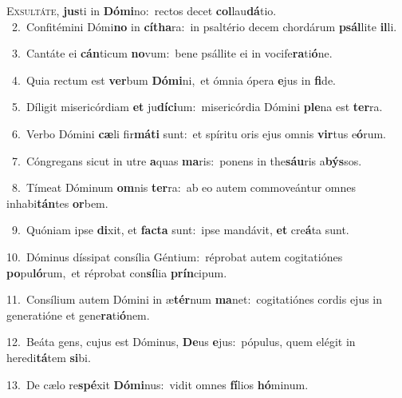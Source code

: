 \lettrine{\initial\textcolor{\initialcolor}{E}}{xsultáte,} \textbf{jus}\-ti in \textbf{Dó}\-\textbf{mi}no:~\star rectos decet \textbf{col}\-lau\-\textbf{dá}\-tio.\\
{\numbfont\textcolor{\numbcolor}{~2.}}~Confitémini Dómi\textbf{no} in \textbf{cí}\-\textbf{tha}ra:~\star in psaltério decem chordárum \textbf{psál}\-lite \textbf{il}\-li.\par
{\numbfont\textcolor{\numbcolor}{~3.}}~Cantáte ei \textbf{cán}\-ticum \textbf{no}\-vum:~\star bene psállite ei in vocife\-\textbf{ra}\-ti\-\textbf{ó}\-ne.\par
{\numbfont\textcolor{\numbcolor}{~4.}}~Quia rectum est \textbf{ver}\-bum \textbf{Dó}\-\textbf{mi}ni,~\star et ómnia ópera \textbf{e}\-jus in \textbf{fi}\-de.\par
{\numbfont\textcolor{\numbcolor}{~5.}}~Díligit misericórdiam \textbf{et} ju\-\textbf{dí}\-\textbf{ci}um:~\star misericórdia Dómini \textbf{ple}\-na est \textbf{ter}\-ra.\par
{\numbfont\textcolor{\numbcolor}{~6.}}~Verbo Dómini \textbf{cæ}\-li fir\-\textbf{má}\-\textbf{ti} sunt:~\star et spíritu oris ejus omnis \textbf{vir}\-tus e\-\textbf{ó}\-rum.\par
{\numbfont\textcolor{\numbcolor}{~7.}}~Cóngregans sicut in utre \textbf{a}\-quas \textbf{ma}\-ris:~\star ponens in the\-\textbf{sáu}\-ris a\-\textbf{býs}\-sos.\par
{\numbfont\textcolor{\numbcolor}{~8.}}~Tímeat Dóminum \textbf{om}\-nis \textbf{ter}\-ra:~\star ab eo autem commoveántur omnes inhabi\-\textbf{tán}\-tes \textbf{or}\-bem.\par
{\numbfont\textcolor{\numbcolor}{~9.}}~Quóniam ipse \textbf{di}\-xit, et \textbf{fac}\-\textbf{ta} sunt:~\star ipse mandávit, \textbf{et} cre\-\textbf{á}\-ta sunt.\par
{\numbfont\textcolor{\numbcolor}{10.}}~Dóminus díssipat consília Géntium:~\dagger réprobat autem cogitatiónes \textbf{po}\-pu\-\textbf{ló}\-rum,~\star et réprobat con\-\textbf{sí}\-lia \textbf{prín}\-cipum.\par
{\numbfont\textcolor{\numbcolor}{11.}}~Consílium autem Dómini in æ\-\textbf{tér}\-num \textbf{ma}\-net:~\star cogitatiónes cordis ejus in generatióne et gene\-\textbf{ra}\-ti\-\textbf{ó}\-nem.\par
{\numbfont\textcolor{\numbcolor}{12.}}~Beáta gens, cujus est Dóminus, \textbf{De}\-us \textbf{e}\-jus:~\star pópulus, quem elégit in heredi\-\textbf{tá}\-tem \textbf{si}\-bi.\par
{\numbfont\textcolor{\numbcolor}{13.}}~De cælo re\-\textbf{spé}\-xit \textbf{Dó}\-\textbf{mi}nus:~\star vidit omnes \textbf{fí}\-lios \textbf{hó}\-minum.\par
